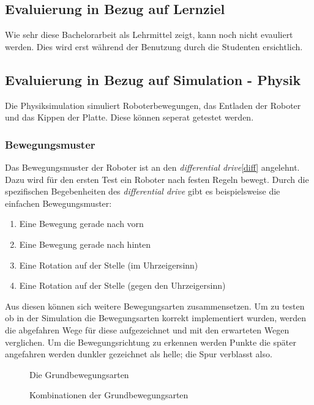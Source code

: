 {\subsection{Evaluierung in Bezug auf Lernziel}
Wie sehr diese Bachelorarbeit als Lehrmittel zeigt, kann noch nicht evauliert werden. Dies wird erst w{\"{a}}hrend
der Benutzung durch die Studenten ersichtlich.

\subsection{Evaluierung in Bezug auf Simulation - Physik}
Die Physiksimulation simuliert Roboterbewegungen, das Entladen der Roboter und das Kippen der Platte. Diese k{\"{o}}nnen
seperat getestet werden.

\subsubsection{Bewegungsmuster}
Das Bewegungsmuster der Roboter ist an den \textit{differential drive}\ref{diff} angelehnt. Dazu wird f{\"{u}}r den ersten Test ein
Roboter nach festen Regeln bewegt. Durch die spezifischen Begebenheiten des \textit{differential drive} gibt es beispielsweise die einfachen
Bewegungsmuster:
\begin{enumerate}
	\item Eine Bewegung gerade nach vorn
	\item Eine Bewegung gerade nach hinten
	\item Eine Rotation auf der Stelle (im Uhrzeigersinn)
	\item Eine Rotation auf der Stelle (gegen den Uhrzeigersinn)
\end{enumerate}

Aus diesen k{\"{o}}nnen sich weitere Bewegungsarten zusammensetzen. Um zu testen ob in der Simulation die Bewegungsarten korrekt implementiert
wurden, werden die abgefahren Wege f{\"{u}}r diese aufgezeichnet und mit den erwarteten Wegen verglichen. Um die Bewegungsrichtung zu erkennen
werden Punkte die sp{\"{a}}ter angefahren werden dunkler gezeichnet als helle; die Spur verblasst also.
\begin{figure}
	\centering
	\caption{Die Grundbewegungsarten}
	\label{fig:move1}
\end{figure}%
\begin{figure}
	\centering
	\caption{Kombinationen der Grundbewegungsarten}
	\label{fig:move2}
\end{figure}

}
